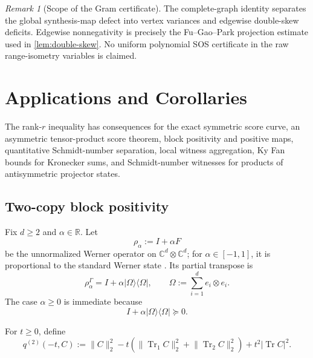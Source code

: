 \documentclass[11pt,reqno]{amsart}
\theoremstyle{remark}
\newtheorem{remark}[theorem]{Remark}
\DeclareMathOperator{\Tr}{Tr}
\newcommand{\ketbra}[2]{\lvert #1\rangle\!\langle #2\rvert}
\newcommand{\norm}[1]{\lVert #1\rVert}
\newcommand{\abs}[1]{\lvert #1\rvert}
\newcommand{\C}{\mathbb C}
\begin{document}
\begin{remark}[Scope of the Gram certificate]
The complete-graph identity separates the global synthesis-map defect
into vertex variances and edgewise double-skew deficits. Edgewise
nonnegativity is precisely the Fu--Gao--Park projection estimate used
in \cref{lem:double-skew}. No uniform polynomial SOS certificate in
the raw range-isometry variables is claimed.
\end{remark}

\section{Applications and Corollaries}

The rank-$r$ inequality has consequences for the exact symmetric
score curve, an asymmetric tensor-product score theorem, block
positivity and positive maps,
quantitative Schmidt-number separation, local witness aggregation,
Ky Fan bounds for Kronecker sums, and Schmidt-number witnesses for
products of antisymmetric projector states.

\subsection{Two-copy block positivity}

Fix $d\ge2$ and $\alpha\in\mathbb R$. Let
\[
    \rho_\alpha
    :=
    I+\alpha F
\]
be the unnormalized Werner operator on $\C^d\otimes\C^d$; for
$\alpha\in[-1,1]$, it is proportional to the standard Werner state
\cite{Werner1989}. Its partial transpose is
\[
    \rho_\alpha^\Gamma
    =
    I+\alpha\ketbra{\Omega}{\Omega},
    \qquad
    \Omega
    :=
    \sum_{i=1}^d e_i\otimes e_i.
\]
The case $\alpha\ge0$ is immediate because
\[
    I+\alpha\ketbra{\Omega}{\Omega}\succeq0.
\]

For $t\ge0$, define
\begin{equation}
\label{eq:q2}
    q^{(2)}(-t,C)
    :=
    \norm{C}_2^2
    -
    t\left(
      \norm{\Tr_1C}_2^2+\norm{\Tr_2C}_2^2
    \right)
    +
    t^2\abs{\Tr C}^2.
\end{equation}
\end{document}
